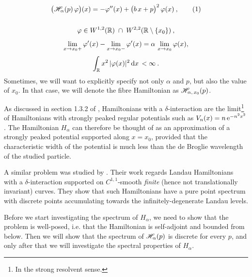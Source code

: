 \begin{gather*}
    \big( \Hf_\alpha(p) \, \varphi \big)(x)
    = -\varphi''(x)
    + \big( b \, x + p \big)^2 \, \varphi(x) \: ,
    \numberthis\label{eqn-dirac-fibre-hamiltonian}
    \\[15pt]
    \varphi \in W^{1,2}(\R) \; \cap \; W^{2,2}( \R \setminus \{ x_0 \}) \: ,
    \\[5pt]
    \lim_{x \to x_0+} \varphi'(x) - \lim_{x \to x_0-} \varphi'(x) = \alpha \, \lim_{x \to x_0} \varphi(x),
    \\[3pt]
    \int_\R x^2 \, |\varphi(x)|^2 \d{x} < \infty \: .
\end{gather*}
Sometimes, we will want to explicitly specify not only $\alpha$ and $p$, but also the value of $x_0$. In that case, we will denote the fibre Hamiltonian as $\mathscr{H}_{\alpha, \, x_0}(p)$.

\medskip

As discussed in section 1.3.2 of \cite{Albeverio2005}, Hamiltonians with a $\delta$-interaction are the limit\footnote{In the strong resolvent sense.} of Hamiltonians with strongly peaked regular potentials such as $V_n(x) = n \, \mathrm{e}^{-n^2 x^2}$. The Hamiltonian $H_\alpha$ can therefore be thought of as an approximation of a strongly peaked potential supported along $x = x_0$, provided that the characteristic width of the potential is much less than the de Broglie wavelength of the studied particle.

A similar problem was studied by \cite{BehrndtExner2018}. Their work regards Landau Hamiltonians with a $\delta$-interaction supported on $C^{1,1}$-smooth \textit{finite} (hence not translationally invariant) curves. They show that such Hamiltonians have a pure point spectrum with discrete points accumulating towards the infinitely-degenerate Landau levels.

\medskip

Before we start investigating the spectrum of $H_\alpha$, we need to show that the problem is well-posed, i.e. that the Hamiltonian is self-adjoint and bounded from below. Then we will show that the spectrum of $\mathscr{H}_\alpha(p)$ is discrete for every $p$, and only after that we will investigate the spectral properties of $H_\alpha$.

